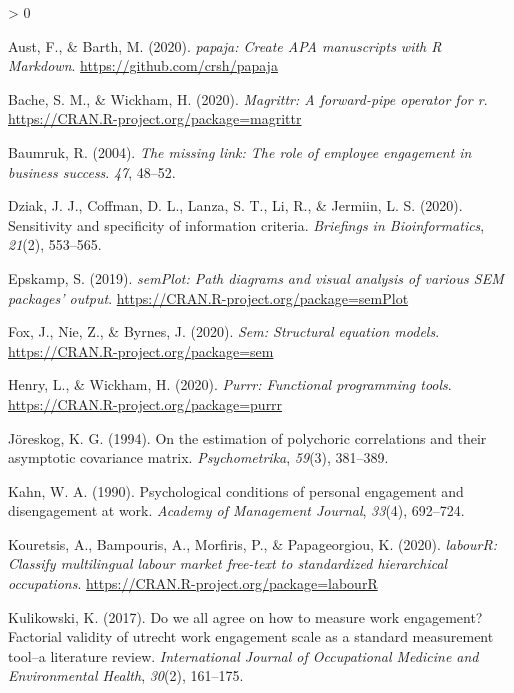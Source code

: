 \documentclass[
  english,
  man]{apa7}
\newlength{\cslhangindent}
\newenvironment{CSLReferences}[2] %
 {%
  \setlength{\parindent}{0pt}
  \ifodd #1 \everypar{\setlength{\hangindent}{\cslhangindent}}\ignorespaces\fi
  \ifnum #2 > 0
  \setlength{\parskip}{#2\baselineskip}
  \fi
 }%
 {}
\begin{document}
\hypertarget{refs}{}
\begin{CSLReferences}{1}{0}
\leavevmode\hypertarget{ref-R-papaja}{}%
Aust, F., \& Barth, M. (2020). \emph{{papaja}: {Create} {APA} manuscripts with {R Markdown}}. \url{https://github.com/crsh/papaja}

\leavevmode\hypertarget{ref-R-magrittr}{}%
Bache, S. M., \& Wickham, H. (2020). \emph{Magrittr: A forward-pipe operator for r}. \url{https://CRAN.R-project.org/package=magrittr}

\leavevmode\hypertarget{ref-baumruk2004missing}{}%
Baumruk, R. (2004). \emph{The missing link: The role of employee engagement in business success}. \emph{47}, 48--52.

\leavevmode\hypertarget{ref-dziak2020sensitivity}{}%
Dziak, J. J., Coffman, D. L., Lanza, S. T., Li, R., \& Jermiin, L. S. (2020). Sensitivity and specificity of information criteria. \emph{Briefings in Bioinformatics}, \emph{21}(2), 553--565.

\leavevmode\hypertarget{ref-R-semPlot}{}%
Epskamp, S. (2019). \emph{semPlot: Path diagrams and visual analysis of various SEM packages' output}. \url{https://CRAN.R-project.org/package=semPlot}

\leavevmode\hypertarget{ref-R-sem}{}%
Fox, J., Nie, Z., \& Byrnes, J. (2020). \emph{Sem: Structural equation models}. \url{https://CRAN.R-project.org/package=sem}

\leavevmode\hypertarget{ref-R-purrr}{}%
Henry, L., \& Wickham, H. (2020). \emph{Purrr: Functional programming tools}. \url{https://CRAN.R-project.org/package=purrr}

\leavevmode\hypertarget{ref-joreskog1994estimation}{}%
Jöreskog, K. G. (1994). On the estimation of polychoric correlations and their asymptotic covariance matrix. \emph{Psychometrika}, \emph{59}(3), 381--389.

\leavevmode\hypertarget{ref-kahn1990psychological}{}%
Kahn, W. A. (1990). Psychological conditions of personal engagement and disengagement at work. \emph{Academy of Management Journal}, \emph{33}(4), 692--724.

\leavevmode\hypertarget{ref-R-labourR}{}%
Kouretsis, A., Bampouris, A., Morfiris, P., \& Papageorgiou, K. (2020). \emph{labourR: Classify multilingual labour market free-text to standardized hierarchical occupations}. \url{https://CRAN.R-project.org/package=labourR}

\leavevmode\hypertarget{ref-kulikowski2017we}{}%
Kulikowski, K. (2017). Do we all agree on how to measure work engagement? Factorial validity of utrecht work engagement scale as a standard measurement tool--a literature review. \emph{International Journal of Occupational Medicine and Environmental Health}, \emph{30}(2), 161--175.


\end{CSLReferences}
\end{document}
